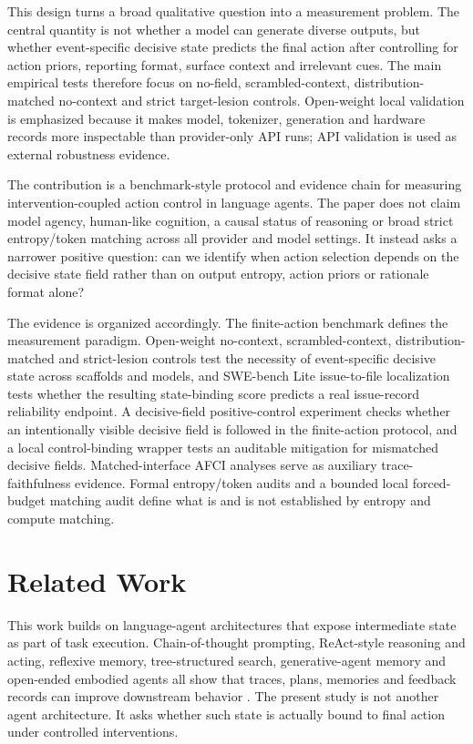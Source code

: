 ﻿\documentclass[preprint,12pt,authoryear]{elsarticle}
\begin{document}
This design turns a broad qualitative question into a measurement problem. The central quantity is not whether a model can generate diverse outputs, but whether event-specific decisive state predicts the final action after controlling for action priors, reporting format, surface context and irrelevant cues. The main empirical tests therefore focus on no-field, scrambled-context, distribution-matched no-context and strict target-lesion controls. Open-weight local validation is emphasized because it makes model, tokenizer, generation and hardware records more inspectable than provider-only API runs; API validation is used as external robustness evidence.

The contribution is a benchmark-style protocol and evidence chain for measuring intervention-coupled action control in language agents. The paper does not claim model agency, human-like cognition, a causal status of reasoning or broad strict entropy/token matching across all provider and model settings. It instead asks a narrower positive question: can we identify when action selection depends on the decisive state field rather than on output entropy, action priors or rationale format alone?

The evidence is organized accordingly. The finite-action benchmark defines the measurement paradigm. Open-weight no-context, scrambled-context, distribution-matched and strict-lesion controls test the necessity of event-specific decisive state across scaffolds and models, and SWE-bench Lite issue-to-file localization tests whether the resulting state-binding score predicts a real issue-record reliability endpoint. A decisive-field positive-control experiment checks whether an intentionally visible decisive field is followed in the finite-action protocol, and a local control-binding wrapper tests an auditable mitigation for mismatched decisive fields. Matched-interface AFCI analyses serve as auxiliary trace-faithfulness evidence. Formal entropy/token audits and a bounded local forced-budget matching audit define what is and is not established by entropy and compute matching.

\section{Related Work}

This work builds on language-agent architectures that expose intermediate state as part of task execution. Chain-of-thought prompting, ReAct-style reasoning and acting, reflexive memory, tree-structured search, generative-agent memory and open-ended embodied agents all show that traces, plans, memories and feedback records can improve downstream behavior \citep{wei2022cot,yao2023react,shinn2023reflexion,yao2023tot,park2023generative,wang2024voyager}. The present study is not another agent architecture. It asks whether such state is actually bound to final action under controlled interventions.
\end{document}
